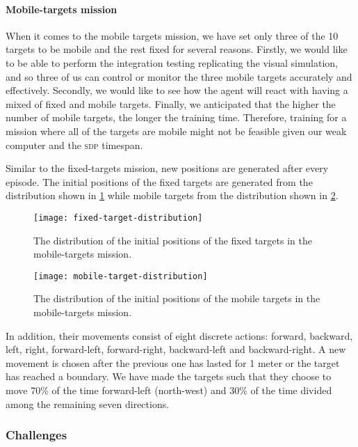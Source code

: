 \documentclass[../main.tex]{subfiles}
\begin{document}
\paragraph{Mobile-targets mission}

When it comes to the mobile targets mission, we have set only three of
the 10 targets to be mobile and the rest fixed for several reasons.
Firstly, we would like to be able to perform the integration testing
replicating the visual simulation, and so three of us can control or
monitor the three mobile targets accurately and effectively.
Secondly, we would like to see how the agent will react with having a
mixed of fixed and mobile targets.
Finally, we anticipated that the higher the number of mobile targets, the 
longer the training time. 
Therefore, training for a mission where all of the targets are mobile
might not be feasible given our weak computer and the \textsc{sdp}
timespan.

Similar to the fixed-targets mission,
new positions are generated after every episode.
The initial positions of the fixed targets are generated from 
the distribution shown in
\cref{fig:fixed-position-distribution}
while mobile targets from the distribution shown in
\cref{fig:mobile-position-distribution}.

\begin{figure}[tbp]
	\centering
        \texttt{[image: fixed-target-distribution]}
	\caption{The distribution of the initial positions of the
        fixed targets in the mobile-targets mission.}
	\label{fig:fixed-position-distribution}
\end{figure}

\begin{figure}[tbp]
	\centering
	\texttt{[image: mobile-target-distribution]}
	\caption{The distribution of the initial positions of the
            mobile targets in the mobile-targets mission.}
	\label{fig:mobile-position-distribution}
\end{figure}

In addition, their movements consist of eight discrete
actions: forward, backward, left, right,
forward-left, forward-right, backward-left and backward-right.
A new movement is chosen after the previous one has lasted for 1 meter
or the target has reached a boundary.
We have made the targets such that they choose to move 70\% 
of the time forward-left (north-west) and 30\% of the time divided
among the remaining seven directions.

\subsubsection{Challenges}
\end{document}
